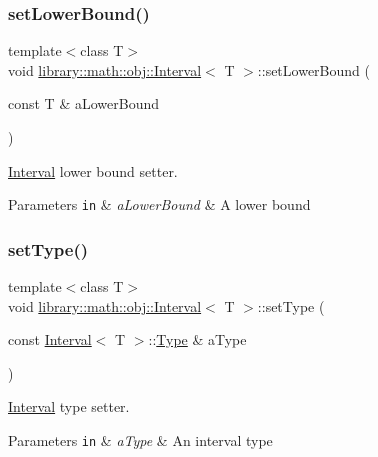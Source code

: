 \subsubsection{\texorpdfstring{set\+Lower\+Bound()}{setLowerBound()}}
{\footnotesize\ttfamily template$<$class T$>$ \\
void \hyperlink{classlibrary_1_1math_1_1obj_1_1_interval}{library\+::math\+::obj\+::\+Interval}$<$ T $>$\+::set\+Lower\+Bound (\begin{DoxyParamCaption}\item[{const T \&}]{a\+Lower\+Bound }\end{DoxyParamCaption})}



\hyperlink{classlibrary_1_1math_1_1obj_1_1_interval}{Interval} lower bound setter. 


\begin{DoxyParams}[1]{Parameters}
\mbox{\tt in}  & {\em a\+Lower\+Bound} & A lower bound \\
\hline
\end{DoxyParams}
\mbox{\label{classlibrary_1_1math_1_1obj_1_1_interval_a4dfb117d5a9c23bd32a3631fcf3686ec}} 
\subsubsection{\texorpdfstring{set\+Type()}{setType()}}
{\footnotesize\ttfamily template$<$class T$>$ \\
void \hyperlink{classlibrary_1_1math_1_1obj_1_1_interval}{library\+::math\+::obj\+::\+Interval}$<$ T $>$\+::set\+Type (\begin{DoxyParamCaption}\item[{const \hyperlink{classlibrary_1_1math_1_1obj_1_1_interval}{Interval}$<$ T $>$\+::\hyperlink{classlibrary_1_1math_1_1obj_1_1_interval_abc7177f1c446d8273e70c989953667d1}{Type} \&}]{a\+Type }\end{DoxyParamCaption})}



\hyperlink{classlibrary_1_1math_1_1obj_1_1_interval}{Interval} type setter. 


\begin{DoxyParams}[1]{Parameters}
\mbox{\tt in}  & {\em a\+Type} & An interval type \\
\hline
\end{DoxyParams}
\mbox{\label{classlibrary_1_1math_1_1obj_1_1_interval_a9c6b857d9fad97969635f669428c2b48}} 
